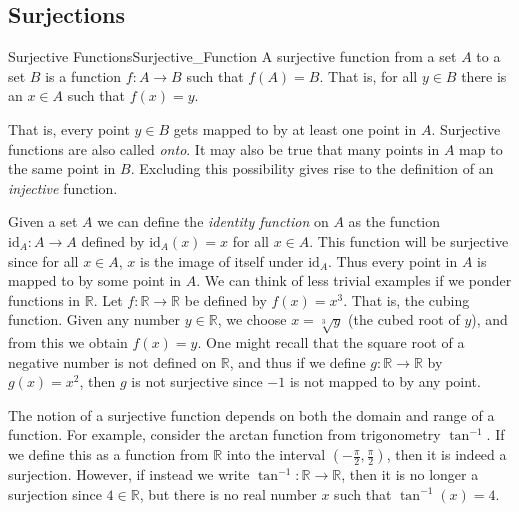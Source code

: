     \subsection{Surjections}
        \begin{fdefinition}{Surjective Functions}{Surjective_Function}
            A \gls{surjective function} from a \gls{set} $A$ to a set $B$ is a
            \gls{function} $f:A\rightarrow{B}$ such that $f(A)=B$. That is, for
            all $y\in{B}$ there is an $x\in{A}$ such that $f(x)=y$.
        \end{fdefinition}
        That is, every point $y\in{B}$ gets mapped to by at least one point in
        $A$. Surjective functions are also called \textit{onto}. It may also be
        true that many points in $A$ map to the same point in $B$. Excluding
        this possibility gives rise to the definition of an \textit{injective}
        function.
        \begin{example}
            Given a set $A$ we can define the \textit{identity function} on $A$
            as the function $\textrm{id}_{A}:A\rightarrow{A}$ defined by
            $\textrm{id}_{A}(x)=x$ for all $x\in{A}$. This function will be
            surjective since for all $x\in{A}$, $x$ is the image of itself under
            $\textrm{id}_{A}$. Thus every point in $A$ is mapped to by some
            point in $A$. We can think of less trivial examples if we ponder
            functions in $\mathbb{R}$. Let $f:\mathbb{R}\rightarrow\mathbb{R}$
            be defined by $f(x)=x^{3}$. That is, the cubing function. Given any
            number $y\in\mathbb{R}$, we choose $x=\sqrt[3]{y}$ (the cubed root
            of $y$), and from this we obtain $f(x)=y$. One might recall that the
            square root of a negative number is not defined on $\mathbb{R}$, and
            thus if we define $g:\mathbb{R}\rightarrow\mathbb{R}$ by
            $g(x)=x^{2}$, then $g$ is not surjective since $\minus{1}$ is not
            mapped to by any point.
        \end{example}
        \begin{example}
            The notion of a surjective function depends on both the domain and
            range of a function. For example, consider the arctan function from
            trigonometry $\tan^{\minus{1}}$. If we define this as a function
            from $\mathbb{R}$ into the interval
            $(\minus\frac{\pi}{2},\frac{\pi}{2})$, then it is indeed a
            surjection. However, if instead we write
            $\tan^{\minus{1}}:\mathbb{R}\rightarrow\mathbb{R}$, then it is no
            longer a surjection since $4\in\mathbb{R}$, but there is no real
            number $x$ such that $\tan^{\minus{1}}(x)=4$.
        \end{example}
